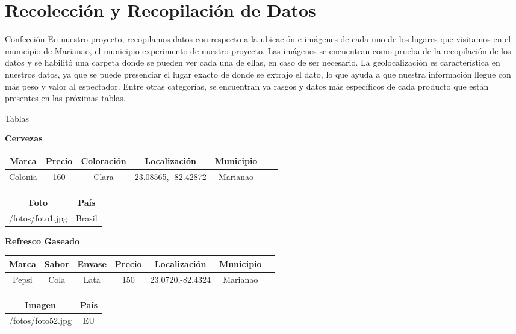 \section{Recolección y Recopilación de Datos}
\begin{frame}[fragile]{Confección}
    En nuestro proyecto, recopilamos datos con respecto a la ubicación e imágenes de cada uno de los lugares que visitamos en el municipio de Marianao, el municipio experimento de nuestro proyecto. 
Las imágenes se encuentran como prueba de la recopilación de los datos y se habilitó una carpeta donde se pueden ver cada una de ellas, en caso de ser necesario.  
La geolocalización es característica en nuestros datos, ya que se puede presenciar el lugar exacto de donde se extrajo el dato, lo que ayuda a que nuestra información llegue con más peso y valor al espectador. 
Entre otras categorías, se encuentran ya rasgos y datos más específicos de cada producto que están presentes en las próximas tablas.
\end{frame}


\newpage
\begin{frame}[fragile]{Tablas}
    \begin{center}
        \textbf{Cervezas}
        \begin{tabular}{|c|c|c|c|c|c|c|}
            \hline
             Marca & Precio & Coloración & Localización & Municipio\\
            \hline
             Colonia & 160 & Clara & 23.08565, -82.42872 & Marianao\\
            \hline
        \end{tabular}

        \begin{tabular}{|c|c|}
            \hline
             Foto & País\\
            \hline
             /fotos/foto1.jpg & Brasil\\
            \hline
        \end{tabular}
  


        \textbf{Refresco Gaseado}
        \begin{tabular}{|c|c|c|c|c|c|c|}
            \hline
             Marca & Sabor & Envase & Precio & Localización & Municipio\\
            \hline
             Pepsi & Cola & Lata & 150 & 23.0720,-82.4324 & Marianao\\
            \hline
        \end{tabular}

        \begin{tabular}{|c|c|}
            \hline
             Imagen & País\\
            \hline
             /fotos/foto52.jpg& EU\\
            \hline
        \end{tabular}
    \end{center}
\end{frame}


